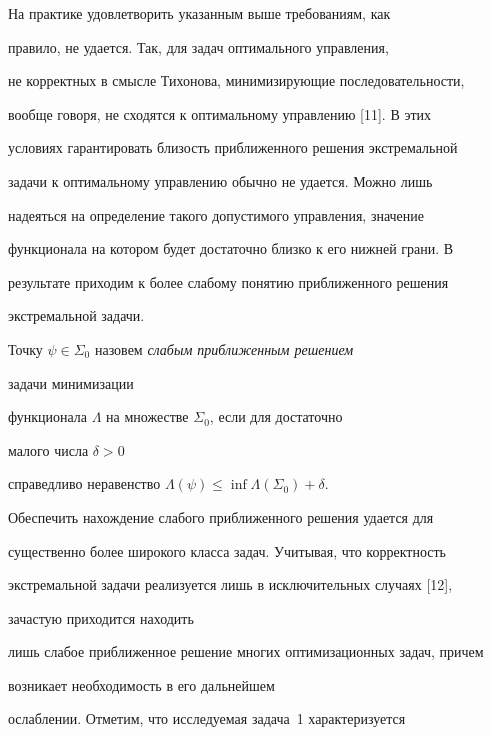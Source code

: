  


На практике удовлетворить указанным выше требованиям, как 


правило, не удается. Так, для задач оптимального управления, 


не корректных в смысле Тихонова, минимизирующие последовательности, 


вообще говоря, не сходятся к оптимальному управлению [11]. В этих 


условиях гарантировать близость приближенного решения экстремальной 


задачи к оптимальному управлению обычно не удается. Можно лишь 


надеяться на определение такого допустимого управления, значение 


функционала на котором будет достаточно близко к его нижней грани. В 


результате приходим к более слабому понятию приближенного решения 


экстремальной задачи. 


 


\begin{defn} 


Точку $\psi\in\Sigma_0$ назовем {\it слабым приближенным решением} 


задачи минимизации 


функционала $\Lambda$ на множестве $\Sigma_0$, если для достаточно 


малого числа $\delta>0$ 


справедливо неравенство $\Lambda(\psi)\le\inf\Lambda(\Sigma_0)+\delta$. 


\end{defn} 


 


Обеспечить нахождение слабого приближенного решения удается для 


существенно более широкого класса задач. Учитывая, что корректность 


экстремальной задачи реализуется лишь в исключительных случаях [12], 


зачастую приходится находить


лишь слабое приближенное решение многих оптимизационных задач, причем 


возникает необходимость в его дальнейшем 


ослаблении. Отметим, что исследуемая задача~1 характеризуется 


